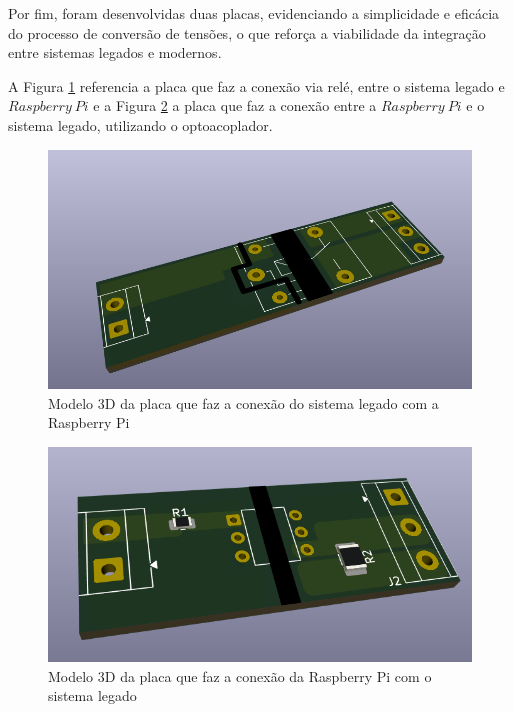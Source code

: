 \documentclass{ecatfg}
\begin{document}
Por fim, foram desenvolvidas duas placas, evidenciando a simplicidade e eficácia do processo de conversão de tensões, o que reforça a viabilidade da integração entre sistemas legados e modernos. \par

A Figura \ref{fig:clp_rasp_board} referencia a placa que faz a conexão via relé, entre o sistema legado e $Raspberry\ Pi$ e a Figura \ref{fig:rasp_clp_board} a placa que faz a conexão entre a $Raspberry\ Pi$ e o sistema legado, utilizando o optoacoplador. \par

\begin{figure}[!htb]
    \centering
    \includegraphics[scale=0.15]{Figuras/placa_clp_rele.png}
    \caption{Modelo 3D da placa que faz a conexão do sistema legado com a Raspberry Pi}
    \label{fig:clp_rasp_board}
\end{figure}

\begin{figure}[!htb]
    \centering
    \includegraphics[scale=0.15]{Figuras/placa_rasp_clp.png}
    \caption{Modelo 3D da placa que faz a conexão da Raspberry Pi com o sistema legado}
    \label{fig:rasp_clp_board}
\end{figure}
\end{document}
